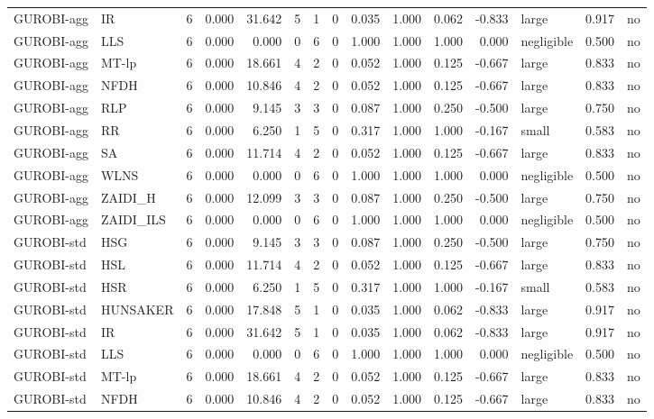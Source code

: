 \begin{table}[htbp]
\begin{tabular}{llrrrrrrrrrrlrr}
GUROBI-agg & IR & 6 & 0.000 & 31.642 & 5 & 1 & 0 & 0.035 & 1.000 & 0.062 & -0.833 & large & 0.917 & no \\
GUROBI-agg & LLS & 6 & 0.000 & 0.000 & 0 & 6 & 0 & 1.000 & 1.000 & 1.000 & 0.000 & negligible & 0.500 & no \\
GUROBI-agg & MT-lp & 6 & 0.000 & 18.661 & 4 & 2 & 0 & 0.052 & 1.000 & 0.125 & -0.667 & large & 0.833 & no \\
GUROBI-agg & NFDH & 6 & 0.000 & 10.846 & 4 & 2 & 0 & 0.052 & 1.000 & 0.125 & -0.667 & large & 0.833 & no \\
GUROBI-agg & RLP & 6 & 0.000 & 9.145 & 3 & 3 & 0 & 0.087 & 1.000 & 0.250 & -0.500 & large & 0.750 & no \\
GUROBI-agg & RR & 6 & 0.000 & 6.250 & 1 & 5 & 0 & 0.317 & 1.000 & 1.000 & -0.167 & small & 0.583 & no \\
GUROBI-agg & SA & 6 & 0.000 & 11.714 & 4 & 2 & 0 & 0.052 & 1.000 & 0.125 & -0.667 & large & 0.833 & no \\
GUROBI-agg & WLNS & 6 & 0.000 & 0.000 & 0 & 6 & 0 & 1.000 & 1.000 & 1.000 & 0.000 & negligible & 0.500 & no \\
GUROBI-agg & ZAIDI\_H & 6 & 0.000 & 12.099 & 3 & 3 & 0 & 0.087 & 1.000 & 0.250 & -0.500 & large & 0.750 & no \\
GUROBI-agg & ZAIDI\_ILS & 6 & 0.000 & 0.000 & 0 & 6 & 0 & 1.000 & 1.000 & 1.000 & 0.000 & negligible & 0.500 & no \\
GUROBI-std & HSG & 6 & 0.000 & 9.145 & 3 & 3 & 0 & 0.087 & 1.000 & 0.250 & -0.500 & large & 0.750 & no \\
GUROBI-std & HSL & 6 & 0.000 & 11.714 & 4 & 2 & 0 & 0.052 & 1.000 & 0.125 & -0.667 & large & 0.833 & no \\
GUROBI-std & HSR & 6 & 0.000 & 6.250 & 1 & 5 & 0 & 0.317 & 1.000 & 1.000 & -0.167 & small & 0.583 & no \\
GUROBI-std & HUNSAKER & 6 & 0.000 & 17.848 & 5 & 1 & 0 & 0.035 & 1.000 & 0.062 & -0.833 & large & 0.917 & no \\
GUROBI-std & IR & 6 & 0.000 & 31.642 & 5 & 1 & 0 & 0.035 & 1.000 & 0.062 & -0.833 & large & 0.917 & no \\
GUROBI-std & LLS & 6 & 0.000 & 0.000 & 0 & 6 & 0 & 1.000 & 1.000 & 1.000 & 0.000 & negligible & 0.500 & no \\
GUROBI-std & MT-lp & 6 & 0.000 & 18.661 & 4 & 2 & 0 & 0.052 & 1.000 & 0.125 & -0.667 & large & 0.833 & no \\
GUROBI-std & NFDH & 6 & 0.000 & 10.846 & 4 & 2 & 0 & 0.052 & 1.000 & 0.125 & -0.667 & large & 0.833 & no \\

\end{tabular}
\end{table}

